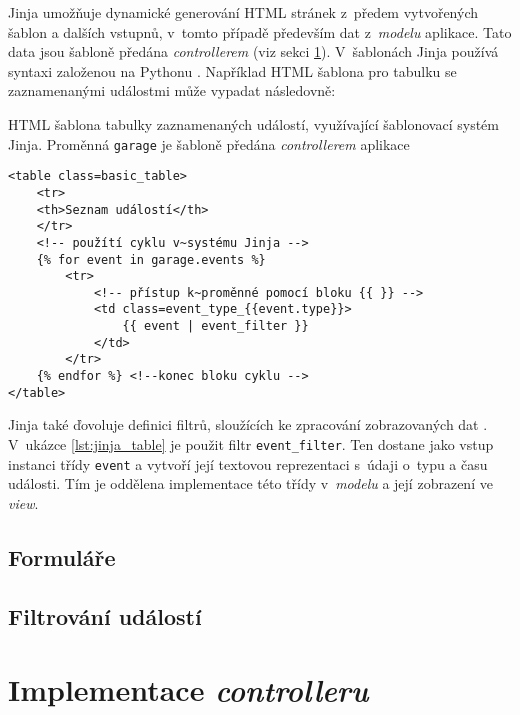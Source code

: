 Jinja umožňuje dynamické generování HTML stránek z~předem vytvořených šablon a dalších vstupnů, v~tomto případě především dat z~\textit{modelu} aplikace. Tato data jsou šabloně předána \textit{controllerem} (viz sekci \ref{sec:im_controller}). V~šablonách Jinja používá syntaxi založenou na Pythonu \cite{jinja}. Například HTML šablona pro tabulku se zaznamenanými událostmi může vypadat následovně:

\begin{listing}[htbp]
\caption{\label{lst:jinja_table} HTML šablona tabulky zaznamenaných událostí, využívající šablonovací systém Jinja. Proměnná \texttt{garage} je šabloně předána \textit{controllerem} aplikace}
\begin{verbatim}
<table class=basic_table>
    <tr>
    <th>Seznam událostí</th>
    </tr>
    <!-- použítí cyklu v~systému Jinja -->
    {% for event in garage.events %}
        <tr>
            <!-- přístup k~proměnné pomocí bloku {{ }} -->
            <td class=event_type_{{event.type}}>
                {{ event | event_filter }}
            </td>
        </tr>
    {% endfor %} <!--konec bloku cyklu -->
</table>
\end{verbatim}
\end{listing}

Jinja také ďovoluje definici filtrů, sloužících ke zpracování zobrazovaných dat \cite{jinja}. V~ukázce \ref{lst:jinja_table} je použit filtr \texttt{event\_filter}. Ten dostane jako vstup instanci třídy \texttt{event} a vytvoří její textovou reprezentaci s~údaji o~typu a času události. Tím je oddělena implementace této třídy v~\textit{modelu} a její zobrazení ve \textit{view}.

\subsection{Formuláře}

\subsection{Filtrování událostí}

\section{Implementace \textit{controlleru}}
\label{sec:im_controller}


